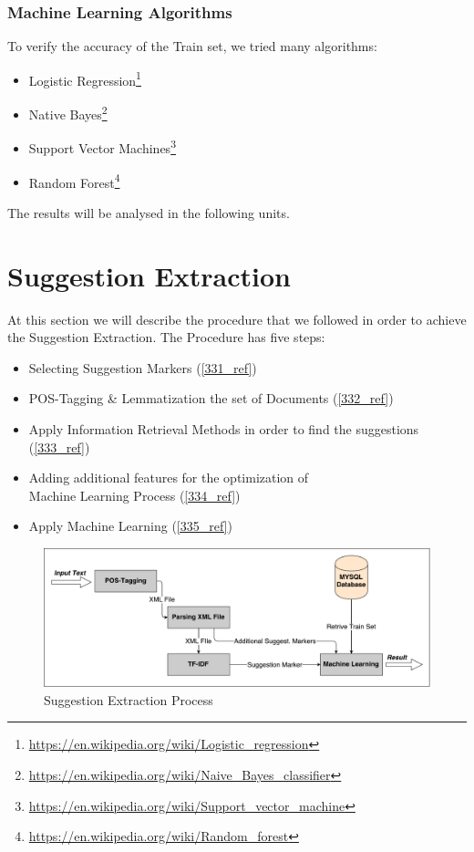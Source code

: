\subsubsection{Machine Learning Algorithms}\label{3233_ref}
To verify the accuracy of the Train set, we tried many algorithms:\\

\begin{itemize}

	\item Logistic Regression\footnote{\url{https://en.wikipedia.org/wiki/Logistic_regression}}
	\item Native Bayes\footnote{\url{https://en.wikipedia.org/wiki/Naive_Bayes_classifier}}
	\item Support Vector Machines\footnote{\url{https://en.wikipedia.org/wiki/Support_vector_machine}}
	\item Random Forest\footnote{\url{https://en.wikipedia.org/wiki/Random_forest}}\\

\end{itemize}
The results will be analysed in the following units.

\section{Suggestion Extraction}\label{33_ref}
At this section we will describe the procedure that we followed in order to achieve the Suggestion Extraction. The Procedure has five steps:\\
\begin{itemize}

	\item Selecting Suggestion Markers (\ref{331_ref})
	\item POS-Tagging \& Lemmatization the set of Documents (\ref{332_ref})
	\item Apply Information Retrieval Methods in order to find the suggestions (\ref{333_ref}) 
	\item Adding additional features for the optimization of\\Machine Learning Process (\ref{334_ref})
	\item Apply Machine Learning (\ref{335_ref})\\

\end{itemize}

\begin{figure}[H]
\centering
\includegraphics[width=1\linewidth]{figure/methods/suggestion_extraction.pdf}
\caption{Suggestion Extraction Process}
\end{figure}

